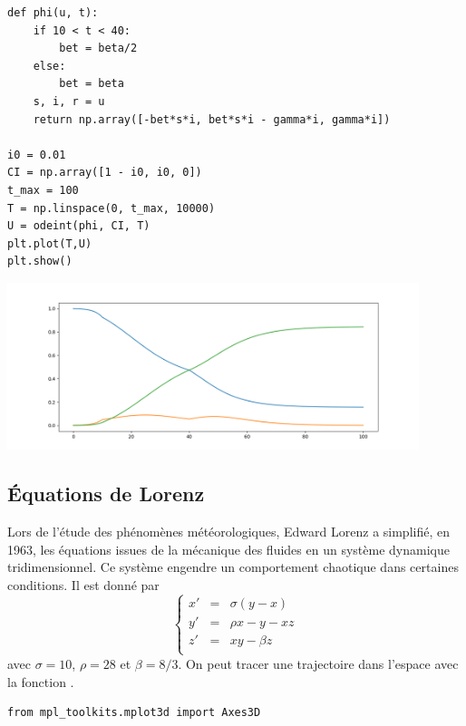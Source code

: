 \begin{Answer}
\begin{lstlisting}
def phi(u, t):
    if 10 < t < 40:
        bet = beta/2
    else:
        bet = beta
    s, i, r = u
    return np.array([-bet*s*i, bet*s*i - gamma*i, gamma*i])

i0 = 0.01
CI = np.array([1 - i0, i0, 0])
t_max = 100
T = np.linspace(0, t_max, 10000)
U = odeint(phi, CI, T)
plt.plot(T,U)
plt.show()
\end{lstlisting}
\begin{center}
\includegraphics[width=12cm]{TP/Images/ED2_SIR2.png}
\end{center}
\end{Answer}
\subsection{Équations de Lorenz}
Lors de l'étude des phénomènes météorologiques, Edward Lorenz a simplifié, en 1963, les équations issues de la mécanique des fluides en un système dynamique tridimensionnel. Ce système engendre un comportement chaotique dans certaines conditions. Il est donné par
\[\left\{\begin{matrix}
x'&=&\sigma(y-x)\\ 
y' &=& \rho x - y - xz\\
z'&=& xy - \beta z\\
\end{matrix}\right.\]
avec $\sigma = 10$, $\rho = 28$ et $\beta = 8/3$.
On peut tracer une trajectoire dans l'espace avec la fonction .
\begin{lstlisting}
from mpl_toolkits.mplot3d import Axes3D
\end{lstlisting}

